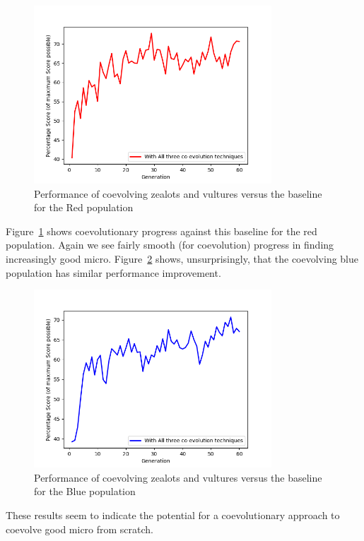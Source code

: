 \documentclass[conference,10pt]{IEEEtran}
\begin{document}
\begin{figure}
    \centerline{
      \includegraphics[width=3.5in]{Rtwotype.png}
      }
    \caption{Performance of coevolving zealots and vultures versus the baseline for the Red population}
    \label{CoZealotsVulturesPopRed}
\end{figure}
Figure~\ref{CoZealotsVulturesPopRed} shows coevolutionary progress
against this baseline for the red population. Again we see fairly
smooth (for coevolution) progress in finding increasingly good
micro. Figure~\ref{CoZealotsVulturesPopBlue} shows, unsurprisingly, that the coevolving blue
population has similar performance improvement.
\begin{figure}
    \centerline{
      \includegraphics[width=3.5in]{Btwotype.png}
      }
    \caption{Performance of coevolving zealots and vultures versus the baseline for the Blue population}
    \label{CoZealotsVulturesPopBlue}
\end{figure}
These results seem to indicate the potential for a coevolutionary
approach to coevolve good micro from scratch.


\end{document}
